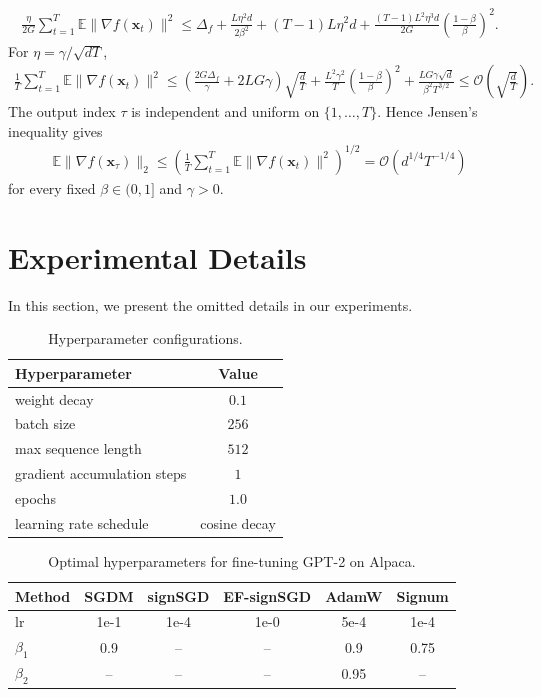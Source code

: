 \documentclass{article}
\newcommand{\E}{\mathbb{E}}
\def \E {\mathbb{E}}
\def \x {\mathbf{x}}
\def \E {\mathbb{E}}
\def \x {\mathbf{x}}
\begin{document}
\begin{align*}
 \frac\eta{2G}\sum_{t=1}^T\E\|\nabla f(\x_t)\|^2
 \le\Delta_f+\frac{L\eta^2d}{2\beta^2}
      +(T-1)L\eta^2d
      +\frac{(T-1)L^2\eta^3d}{2G}
         \left(\frac{1-\beta}{\beta}\right)^2.
\end{align*}
For $\eta=\gamma/\sqrt{dT}$,
\begin{align*}
 \frac1T\sum_{t=1}^T\E\|\nabla f(\x_t)\|^2
 \le\left(\frac{2G\Delta_f}{\gamma}+2LG\gamma\right)\sqrt{\frac dT}
       +\frac{L^2\gamma^2}{T}\left(\frac{1-\beta}{\beta}\right)^2
       +\frac{LG\gamma\sqrt d}{\beta^2T^{3/2}}
       \le\mathcal{O}\left(\sqrt{\frac dT}\right).
\end{align*}
The output index $\tau$ is independent and uniform on $\{1,\ldots,T\}$. Hence Jensen's inequality gives
\begin{align*}
 \E\|\nabla f(\x_\tau)\|_2
 \le\left(\frac1T\sum_{t=1}^T\E\|\nabla f(\x_t)\|^2\right)^{1/2}
 =\mathcal O(d^{1/4}T^{-1/4})
\end{align*}
for every fixed $\beta\in(0,1]$ and $\gamma>0$. 
\section{Experimental Details\label{sec:exp-details}}
In this section, we present the omitted details in our experiments.
\begin{table}
\centering
\caption{Hyperparameter configurations.\label{tab:hyperparams}}
\begin{tabular}{lc}
\toprule
\textbf{Hyperparameter} & \textbf{Value} \\
\midrule
weight decay               & $0.1$        \\
batch size                 & $256$        \\
max sequence length        & $512$        \\
gradient accumulation steps& $1$          \\
epochs                     & $1.0$        \\
learning rate schedule     & cosine decay \\
\bottomrule
\end{tabular}
\end{table}




\begin{table}[t]
\centering
\caption{Optimal hyperparameters for fine-tuning GPT-2 on Alpaca.\label{tab:gpt2-config}}

\begin{tabular}{lccccc}
\toprule
\textbf{Method} & \textbf{SGDM} & \textbf{signSGD} & \textbf{EF-signSGD} & \textbf{AdamW} &  \textbf{Signum} \\
\midrule
lr          & 1e-1 & 1e-4 & 1e-0 & 5e-4 & 1e-4  \\
$\beta_1$   & 0.9  &  --  &  --    & 0.9  & 0.75 \\
$\beta_2$   &  --  &  --  &  --  & 0.95 &  --    \\
\bottomrule
\end{tabular}
\end{table}
\end{document}
